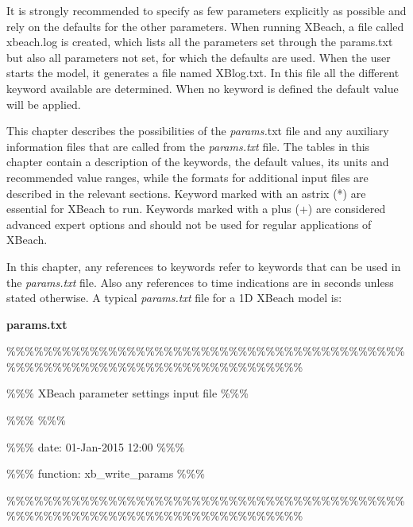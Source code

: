 \documentclass{article}
\begin{document}
\noindent 

\noindent It is strongly recommended to specify as few parameters explicitly as possible and rely on the defaults for the other parameters. When running XBeach, a file called xbeach.log is created, which lists all the parameters set through the params.txt but also all parameters not set, for which the defaults are used. When the user starts the model, it generates a file named XBlog.txt. In this file all the different keyword available are determined. When no keyword is defined the default value will be applied.  

\noindent 

\noindent This chapter describes the possibilities of the \textit{params.}txt file and any auxiliary information files that are called from the \textit{params.txt} file. The tables in this chapter contain a description of the keywords, the default values, its units and recommended value ranges, while the formats for additional input files are described in the relevant sections. Keyword marked with an astrix (*) are essential for XBeach to run. Keywords marked with a plus (+) are considered advanced expert options and should not be used for regular applications of XBeach. 

\noindent In this chapter, any references to keywords refer to keywords that can be used in the \textit{params.txt} file. Also any references to time indications are in seconds unless stated otherwise. A typical \textit{params.txt} file for a 1D XBeach model is:

\noindent \textbf{params.txt}

\noindent \%\%\%\%\%\%\%\%\%\%\%\%\%\%\%\%\%\%\%\%\%\%\%\%\%\%\%\%\%\%\%\%\%\%\%\%\%\%\%\%\%\%\%\%\%\%\%\%\%\%\%\%\%\%\%\%\%\%\%\%\%\%\%\%\%\%\%\%\%\%\%\%\%\%\%

\noindent \%\%\% XBeach parameter settings input file                                \%\%\%

\noindent \%\%\%                                                                     \%\%\%

\noindent \%\%\% date:     01-Jan-2015 12:00                                         \%\%\%

\noindent \%\%\% function: xb\_write\_params                                           \%\%\%

\noindent \%\%\%\%\%\%\%\%\%\%\%\%\%\%\%\%\%\%\%\%\%\%\%\%\%\%\%\%\%\%\%\%\%\%\%\%\%\%\%\%\%\%\%\%\%\%\%\%\%\%\%\%\%\%\%\%\%\%\%\%\%\%\%\%\%\%\%\%\%\%\%\%\%\%\%

\noindent 
\end{document}
